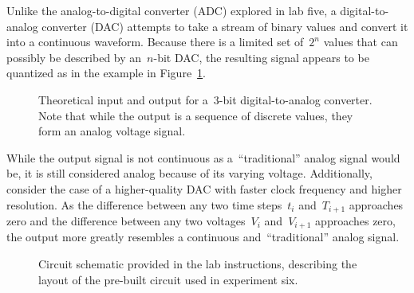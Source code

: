 Unlike the analog-to-digital converter (ADC) explored in lab five, a digital-to-analog converter (DAC) attempts to take a stream of binary values and convert it into a continuous waveform.  Because there is a limited set of~$2^n$ values that can possibly be described by an~$n$-bit DAC, the resulting signal appears to be quantized as in the example in Figure~\ref{fig:theory}.
\begin{figure}[H]
	\centering
	
	\parbox{.6\textwidth}{
	\caption[Theory Plot]{Theoretical input and output for a~3-bit digital-to-analog converter.  Note that while the output is a sequence of discrete values, they form an analog voltage signal.}
	\label{fig:theory}}
\end{figure}
While the output signal is not continuous as a~``traditional'' analog signal would be, it is still considered analog because of its varying voltage.  Additionally, consider the case of a higher-quality DAC with faster clock frequency and higher resolution.  As the difference between any two time steps~$t_i$ and~$T_{i+1}$ approaches zero and the difference between any two voltages~$V_i$ and~$V_{i+1}$ approaches zero, the output more greatly resembles a continuous and~``traditional'' analog signal.

\begin{figure}[H]
	\centering
	
	\parbox{.6\textwidth}{
	\caption[Digital-to-Analog IC schematic]{Circuit schematic provided in the
	lab instructions, describing the layout of the pre-built circuit used in
	experiment six.}
	\label{fig:dacSchem}}
\end{figure}
